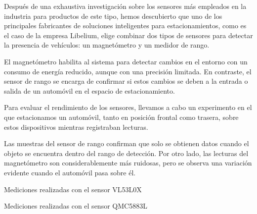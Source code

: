 

Después de una exhaustiva investigación sobre los sensores más empleados en la industria
para productos de este tipo, hemos descubierto que uno de los principales fabricantes de
soluciones inteligentes para estacionamientos, como es el caso de la empresa Libelium,
elige combinar dos tipos de sensores para detectar la presencia de vehículos: un
magnetómetro y un medidor de rango.

El magnetómetro habilita al sistema para detectar cambios en el entorno con un consumo
de energía reducido, aunque con una precisión limitada. En contraste, el sensor de rango
se encarga de confirmar si estos cambios se deben a la entrada o salida de un automóvil
en el espacio de estacionamiento.

Para evaluar el rendimiento de los sensores, llevamos a cabo un experimento en el que
estacionamos un automóvil, tanto en posición frontal como trasera, sobre estos
dispositivos mientras registraban lecturas.

Las muestras del sensor de rango confirman que solo se obtienen datos cuando el objeto
se encuentra dentro del rango de detección. Por otro lado, las lecturas del magnetómetro
son considerablemente más ruidosas, pero se observa una variación evidente cuando el
automóvil pasa sobre él.

\begin{images}[\label{VL53L0X_PLOTS}]{Mediciones realizadas con el sensor VL53L0X}
\end{images}

\begin{images}[\label{QMC5883L_PLOT}]{Mediciones realizadas con el sensor QMC5883L}
\end{images}

